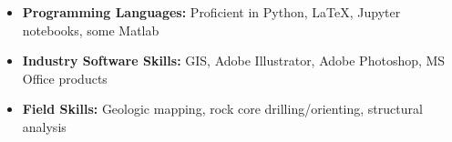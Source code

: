 \documentclass[11pt,a4paper,sans]{moderncv}        %
\begin{document}
\begin{itemize}

%

\item \textbf{Programming Languages:} Proficient in Python, LaTeX, Jupyter notebooks, some Matlab

\vspace{6pt}

\item \textbf{Industry Software Skills:} GIS, Adobe Illustrator, Adobe Photoshop, MS Office products

\vspace{6pt}

\item \textbf{Field Skills:} Geologic mapping, rock core drilling/orienting, structural analysis

\end{itemize}
\end{document}
